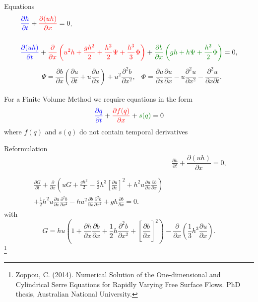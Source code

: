 \documentclass[]{beamer}
\newcommand\blfootnote[1]{%
	\begingroup
	\renewcommand\thefootnote{}\footnote{#1}%
	\addtocounter{footnote}{-1}%
	\endgroup
}
\begin{document}
\begin{frame}{Equations}
	\begin{subequations}
		\begin{align*}
		& {\color{blue}\frac{\partial h}{\partial t}} + {\color{red}\dfrac{\partial (uh)}{\partial x}} = 0,  \\ \\
		& {\color{blue}\dfrac{\partial (uh)}{\partial t}} +  {\color{red}\dfrac{\partial}{\partial x} \left ( u^2h + \dfrac{gh^2}{2} + \dfrac{h^2}{2}{\Psi } + \dfrac{h^3}{3}{ { \Phi } }  \right ) }  +  {\color{green!50!black}\dfrac{\partial b}{\partial x} \left (gh +   h {\Psi } + \dfrac{h^2}{2}{ {  \Phi } }  \right )} = 0,
		\end{align*}
	\end{subequations}
	\begin{align*}
	&{ \Psi }  = \dfrac{\partial b}{\partial x}\left(\dfrac{\partial u}{\partial t} + u\dfrac{\partial u}{\partial x} \right)  + u^2\dfrac{\partial^2 b}{\partial x^2}, &
	{  \Phi }  = \dfrac{\partial u }{\partial x} \dfrac{\partial u}{\partial x} -u \dfrac{\partial^2 u}{\partial x^2}  - \dfrac{\partial^2 u}{\partial x \partial t} .
	\end{align*}
	
	For a Finite Volume Method we require equations in the form
	\begin{equation*}
	{\color{blue}\frac{\partial q}{\partial t}} +  {\color{red}\frac{\partial f(q)}{\partial x}} +  {\color{green!50!black} s(q) } = 0
	\end{equation*}
	where $f(q)$ and $s(q)$ do not contain temporal derivatives
\end{frame}

\begin{frame}{Reformulation}
	\begin{align*}
	& \frac{\partial h}{\partial t} + \dfrac{\partial (uh)}{\partial x} = 0,  \\ \nonumber \\
	\begin{split}
	\frac{\partial G}{\partial t}  + \frac{\partial}{\partial x} \left( {u} G + \frac{gh^2}{2} - \frac{2}{3}h^3 \left[\frac{\partial {u}}{\partial x}\right]^2 + h^2 {u}\frac{\partial {u}}{\partial x}\frac{\partial b}{\partial x} \right) \\ + \frac{1}{2}h^2 {u} \frac{\partial {u}}{\partial x} \frac{\partial^2 b}{\partial x^2}  - h {u}^2\frac{\partial b}{\partial x}\frac{\partial^2 b}{\partial x^2} + gh\frac{\partial b}{\partial x} = 0 .
	\end{split}
	\end{align*}
	with
	\[ G =  h {u} \left(1 + \frac{\partial h}{\partial x}\frac{\partial b}{\partial x} + \frac{1}{2}h\frac{\partial^2 b}{\partial x^2} + \left[\frac{\partial b}{\partial x}\right]^2 \right) - \frac{\partial}{\partial x}\left(\frac{1}{3}h^3  \frac{\partial {u}}{\partial x}\right).\]
	\blfootnote{Zoppou, C. (2014).
		Numerical Solution of the One-dimensional and Cylindrical
		Serre Equations for Rapidly Varying Free Surface Flows. PhD thesis, Australian National University.}
\end{frame}
\end{document}
